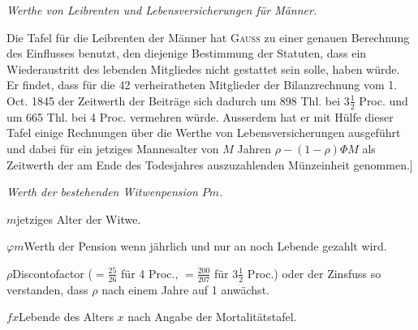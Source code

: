 \begin{center}\textit{Werthe von Leibrenten und Lebensversicherungen für Männer.}\end{center}
\noindent\hspace*{1.2em} Die Tafel für die Leibrenten der Männer hat \textsc{Gauss} zu einer genauen Berechnung des Einflusses benutzt, den diejenige Bestimmung der Statuten, dass ein Wiederaustritt des lebenden Mitgliedes nicht gestattet sein solle, haben würde. Er findet, dass für die 42 verheiratheten Mitglieder der Bilanzrechnung vom 1. Oct. 1845 der Zeitwerth der Beiträge sich dadurch um 898 Thl. bei \(3\tfrac{1}{2}\) Proc. und um 665 Thl. bei 4 Proc. vermehren würde. Ausserdem hat er mit Hülfe dieser Tafel einige Rechnungen über die Werthe von Lebensversicherungen ausgeführt und dabei für ein jetziges Mannesalter von \(M\) Jahren \(\rho-(1-\rho)\Phi M\) als Zeitwerth der am Ende des Todesjahres auszuzahlenden Münzeinheit genommen.]

\begin{center}\textit{Werth der bestehenden Witwenpension \(Pm\).}\end{center}
\noindent \(m\)\quad jetziges Alter der Witwe.\par
\noindent \(\varphi m\)\quad Werth der Pension wenn jährlich und nur an noch Lebende gezahlt wird.\par
\noindent \(\rho\)\quad Discontofactor (\(=\tfrac{25}{26}\) für 4 Proc., \(=\tfrac{200}{207}\) für \(3\tfrac{1}{2}\) Proc.) oder der Zinsfuss so verstanden, dass \(\rho\) nach einem Jahre auf 1 anwächst.\par
\noindent \(fx\)\quad Lebende des Alters \(x\) nach Angabe der Mortalitätstafel.

